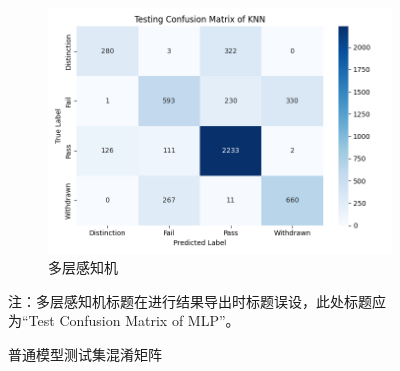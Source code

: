 \documentclass[a4paper, utf8]{ctexart}
\begin{document}
\begin{figure}
\begin{subfigure}{.32\textwidth}
			\includegraphics[width=\textwidth]{./figure/test_mlp.png}
			\caption{多层感知机}
		\end{subfigure}
		\caption{普通模型测试集混淆矩阵}
		{\small 注：多层感知机标题在进行结果导出时标题误设，此处标题应为“Test Confusion Matrix of MLP”。}
	\end{figure}
	
\end{document}
